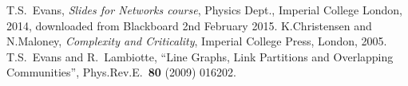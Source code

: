 \documentclass[a4paper,12pt]{article}
\begin{document}
%
%

\begin{thebibliography}{99}
  T.S.\ Evans, \emph{Slides for Networks course}, Physics Dept., Imperial College London, 2014, downloaded from Blackboard 2nd February 2015.
  K.Christensen and N.Maloney,
  \emph{Complexity and Criticality},
  Imperial College Press, London, 2005.
  T.S.\ Evans and R.\ Lambiotte,
  ``Line Graphs, Link Partitions and Overlapping Communities'',
  Phys.Rev.E.\ \textbf{80} (2009) 016202.
\end{thebibliography}
\end{document}
